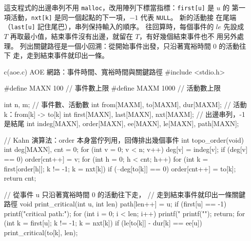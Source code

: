 這支程式的出邊串列不用 \texttt{malloc}，改用陣列下標當指標：\texttt{first[u]} 是 $u$ 的
第一項活動，\texttt{nxt[k]} 是同一個起點的下一項，$-1$ 代表 \texttt{NULL}。 新的活動接
在尾端（\texttt{last[u]} 記住尾巴），串列保持輸入的順序。 往回算時，每個事件的
$\mathit{le}$ 先設成 $T$ 再取最小值，結束事件沒有出邊，就留在 $T$，有好幾個結束事件也不
用另外處理。 列出關鍵路徑是一個小回溯：從開始事件出發，只沿著寬裕時間 $0$ 的活動往下
走，走到結束事件就印出一條。

\begin{example}[label=ex:tps-aoe]{c}{(aoe.c) AOE 網路：事件時間、寬裕時間與關鍵路徑}
#include <stdio.h>

#define MAXN 100                // 事件數上限
#define MAXM 1000               // 活動數上限

int n, m;                       // 事件數、活動數
int from[MAXM], to[MAXM], dur[MAXM];    // 活動 k：from[k] -> to[k]
int first[MAXN], last[MAXN], nxt[MAXM]; // 出邊串列，-1 是結尾
int indeg[MAXN], order[MAXN], ee[MAXN], le[MAXN], path[MAXN];

// Kahn 演算法：order 本身當佇列用，回傳排出幾個事件
int topo_order(void)
{
    int deg[MAXN], cnt = 0;
    for (int v = 0; v < n; v++) {
        deg[v] = indeg[v];
        if (deg[v] == 0) {
            order[cnt++] = v;
        }
    }
    for (int h = 0; h < cnt; h++) {
        for (int k = first[order[h]]; k != -1; k = nxt[k]) {
            if (--deg[to[k]] == 0) {
                order[cnt++] = to[k];
            }
        }
    }
    return cnt;
}

// 從事件 u 只沿著寬裕時間 0 的活動往下走，
// 走到結束事件就印出一條關鍵路徑
void print_critical(int u, int len)
{
    path[len++] = u;
    if (first[u] == -1) {
        printf("critical path:");
        for (int i = 0; i < len; i++) {
            printf(" %
        }
        printf("\n");
        return;
    }
    for (int k = first[u]; k != -1; k = nxt[k]) {
        if (le[to[k]] - dur[k] == ee[u]) {
            print_critical(to[k], len);
        }
    }
}


\end{example}
